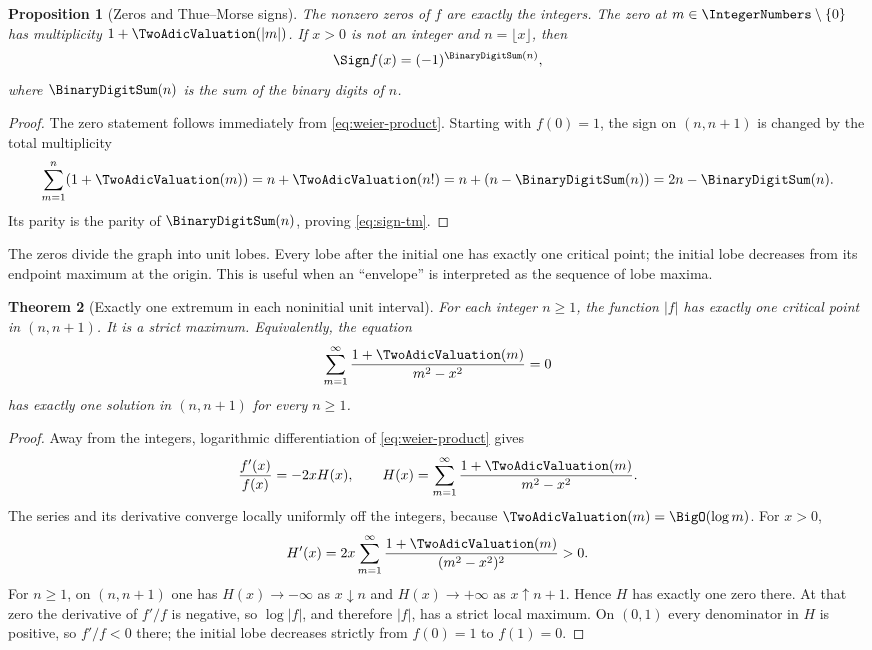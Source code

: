\documentclass[11pt,oneside]{article}
\newtheorem{theorem}{Theorem}[section]
\newtheorem{proposition}[theorem]{Proposition}
\theoremstyle{definition}
\theoremstyle{remark}
\begin{document}
\begin{proposition}[Zeros and Thue--Morse signs]
The nonzero zeros of $f$ are exactly the integers.  The zero at
$m\in\IntegerNumbers\setminus\{0\}$ has multiplicity $1+\TwoAdicValuation(|m|)$.  If $x>0$ is not an
integer and $n=\lfloor x\rfloor$, then
\begin{equation}
 \Sign f(x)=(-1)^{\BinaryDigitSum(n)},                                   \label{eq:sign-tm}
\end{equation}
where $\BinaryDigitSum(n)$ is the sum of the binary digits of $n$.
\end{proposition}

\begin{proof}
The zero statement follows immediately from \eqref{eq:weier-product}.  Starting
with $f(0)=1$, the sign on $(n,n+1)$ is changed by the total multiplicity
\[
 \sum_{m=1}^{n}(1+\TwoAdicValuation(m))
 =n+\TwoAdicValuation(n!)=n+(n-\BinaryDigitSum(n))=2n-\BinaryDigitSum(n).
\]
Its parity is the parity of $\BinaryDigitSum(n)$, proving \eqref{eq:sign-tm}.
\end{proof}

The zeros divide the graph into unit lobes.  Every lobe after the initial
one has exactly one critical point; the initial lobe decreases from its endpoint
maximum at the origin.  This is useful when an ``envelope'' is interpreted as
the sequence of lobe maxima.

\begin{theorem}[Exactly one extremum in each noninitial unit interval]
For each integer $n\ge1$, the function $|f|$ has exactly one critical point in
$(n,n+1)$.  It is a strict maximum.  Equivalently, the equation
\begin{equation}
 \sum_{m=1}^{\infty}\frac{1+\TwoAdicValuation(m)}{m^2-x^2}=0            \label{eq:critical-equation}
\end{equation}
has exactly one solution in $(n,n+1)$ for every $n\ge1$.
\end{theorem}

\begin{proof}
Away from the integers, logarithmic differentiation of
\eqref{eq:weier-product} gives
\[
 \frac{f'(x)}{f(x)}=-2xH(x),\qquad
 H(x)=\sum_{m=1}^{\infty}\frac{1+\TwoAdicValuation(m)}{m^2-x^2}.
\]
The series and its derivative converge locally uniformly off the integers,
because $\TwoAdicValuation(m)=\BigO(\log m)$.  For $x>0$,
\[
 H'(x)=2x\sum_{m=1}^{\infty}
 \frac{1+\TwoAdicValuation(m)}{(m^2-x^2)^2}>0.
\]
For $n\ge1$, on $(n,n+1)$ one has $H(x)\to-\infty$ as $x\downarrow n$ and
$H(x)\to+\infty$ as $x\uparrow n+1$.  Hence $H$ has exactly one zero there.
At that zero the derivative of $f'/f$ is negative, so $\log|f|$, and therefore
$|f|$, has a strict local maximum.  On $(0,1)$ every denominator in $H$ is
positive, so $f'/f<0$ there; the initial lobe decreases strictly from $f(0)=1$
to $f(1)=0$.
\end{proof}
\end{document}
